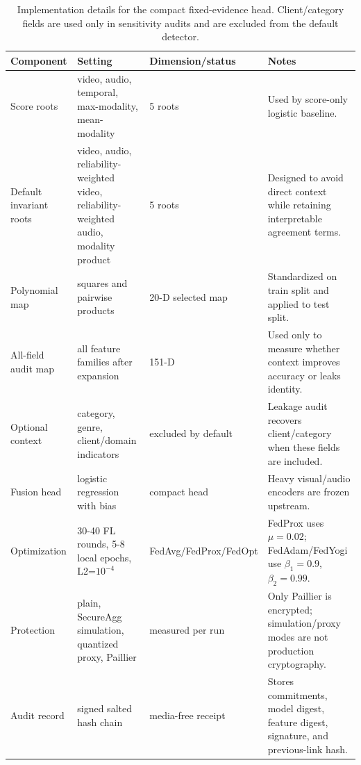 \documentclass[journal]{IEEEtran}
\begin{document}
\begin{table}[!t]
\centering
\caption{Implementation details for the compact fixed-evidence head. Client/category fields are used only in sensitivity audits and are excluded from the default detector.}
\label{tab:implementation}
\scriptsize
\begin{tabularx}{\textwidth}{p{} p{} p{} X}
\toprule
Component & Setting & Dimension/status & Notes \\
\midrule
Score roots & video, audio, temporal, max-modality, mean-modality & 5 roots & Used by score-only logistic baseline. \\
Default invariant roots & video, audio, reliability-weighted video, reliability-weighted audio, modality product & 5 roots & Designed to avoid direct context while retaining interpretable agreement terms. \\
Polynomial map & squares and pairwise products & 20-D selected map & Standardized on train split and applied to test split. \\
All-field audit map & all feature families after expansion & 151-D & Used only to measure whether context improves accuracy or leaks identity. \\
Optional context & category, genre, client/domain indicators & excluded by default & Leakage audit recovers client/category when these fields are included. \\
Fusion head & logistic regression with bias & compact head & Heavy visual/audio encoders are frozen upstream. \\
Optimization & 30-40 FL rounds, 5-8 local epochs, L2=$10^{-4}$ & FedAvg/FedProx/FedOpt & FedProx uses $\mu=0.02$; FedAdam/FedYogi use $\beta_1=0.9$, $\beta_2=0.99$. \\
Protection & plain, SecureAgg simulation, quantized proxy, Paillier & measured per run & Only Paillier is encrypted; simulation/proxy modes are not production cryptography. \\
Audit record & signed salted hash chain & media-free receipt & Stores commitments, model digest, feature digest, signature, and previous-link hash. \\
\bottomrule
\end{tabularx}
\end{table}
\end{document}
